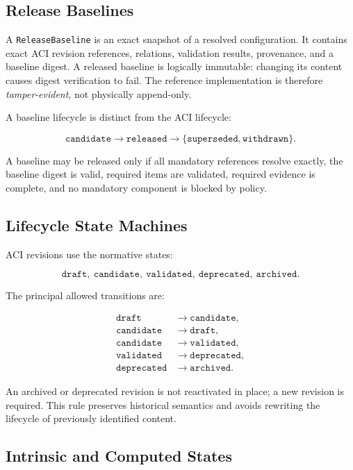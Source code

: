 \documentclass[10pt]{article}
\begin{document}
\subsection{Release Baselines}

A \texttt{ReleaseBaseline} is an exact snapshot of a resolved configuration. It contains exact ACI revision references, relations, validation results, provenance, and a baseline digest. A released baseline is logically immutable: changing its content causes digest verification to fail. The reference implementation is therefore \emph{tamper-evident}, not physically append-only.

A baseline lifecycle is distinct from the ACI lifecycle:

\[
\texttt{candidate} \rightarrow \texttt{released} \rightarrow \{\texttt{superseded},\texttt{withdrawn}\}.
\]

A baseline may be released only if all mandatory references resolve exactly, the baseline digest is valid, required items are validated, required evidence is complete, and no mandatory component is blocked by policy.

\subsection{Lifecycle State Machines}

ACI revisions use the normative states:

\[
\texttt{draft},\ \texttt{candidate},\ \texttt{validated},\ \texttt{deprecated},\ \texttt{archived}.
\]

The principal allowed transitions are:

\begin{align*}
\texttt{draft} &\rightarrow \texttt{candidate},\\
\texttt{candidate} &\rightarrow \texttt{draft},\\
\texttt{candidate} &\rightarrow \texttt{validated},\\
\texttt{validated} &\rightarrow \texttt{deprecated},\\
\texttt{deprecated} &\rightarrow \texttt{archived}.
\end{align*}

An archived or deprecated revision is not reactivated in place; a new revision is required. This rule preserves historical semantics and avoids rewriting the lifecycle of previously identified content.

\subsection{Intrinsic and Computed States}
\end{document}
